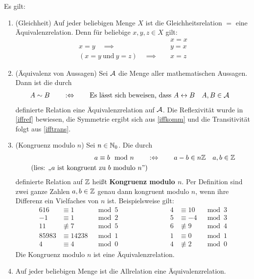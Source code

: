 \begin{bsp} \label{bsp:aequirel} 
    Es gilt:
    \begin{enumerate}
        \item(Gleichheit) Auf jeder beliebigen Menge $X$ ist die Gleichheitsrelation $=$ eine Äquivalenzrelation. Denn für beliebige $x,y,z\in X$ gilt:
        \begin{align*}
            & x = x \\
            x=y\quad \implies\quad & y=x \\
            (x=y\ \text{und}\ y=z) \quad\implies\quad & x=z
        \end{align*}
        \item(Äquivalenz von Aussagen) Sei $\mathcal A$ die Menge aller mathematischen Aussagen. Dann ist die durch
        \begin{align*}
            A\sim B \qquad&:\Leftrightarrow\qquad \text{Es lässt sich beweisen, dass $A\leftrightarrow B$} && A,B\in\mathcal A
        \end{align*}
        definierte Relation eine Äquivalenzrelation auf $\mathcal A$. Die Reflexivität wurde in \cref{iffref} bewiesen, die Symmetrie ergibt sich aus \cref{iffkomm} und die Transitivität folgt aus \cref{ifftrans}.
        \item(Kongruenz modulo $n$) Sei $n\in \mathbb N_0$. Die durch
        \begin{align*}
            a\equiv b\mod n \qquad& :\Leftrightarrow\qquad a-b\in n\mathbb Z && a,b\in \mathbb Z \\
            (\text{lies: „$a$ ist kongruent zu $b$ modulo $n$”})
        \end{align*}
        definierte Relation auf $\mathbb Z$ heißt \textbf{Kongruenz modulo $n$}. Per Definition sind zwei ganze Zahlen $a,b\in \mathbb Z$ genau dann kongruent modulo $n$, wenn ihre Differenz ein Vielfaches von $n$ ist. Beispielsweise gilt:
        \begin{alignat*}{6}
            16 &\equiv 1&\mod 5 \qquad&\qquad&\qquad  4 &\equiv 10 &\mod 3 \\
            -1&\equiv 1 &\mod 2 \qquad&\qquad&\qquad  5 &\equiv -4 &\mod 3 \\
            11 &\not\equiv 7 &\mod 5 \qquad&\qquad&\qquad 6 &\not\equiv 9 &\mod 4 \\
            85983 &\equiv 14238 &\mod 1 \qquad&\qquad&\qquad  1 &\equiv 0 &\mod 1 \\
            4 &\equiv 4 &\mod 0 \qquad&\qquad&\qquad  4 &\not \equiv 2 &\mod 0
        \end{alignat*}
        Die Kongruenz modulo $n$ ist eine Äquivalenzrelation.
        \item Auf jeder beliebigen Menge ist die Allrelation eine Äquivalenzrelation.
    \end{enumerate}
\end{bsp}


